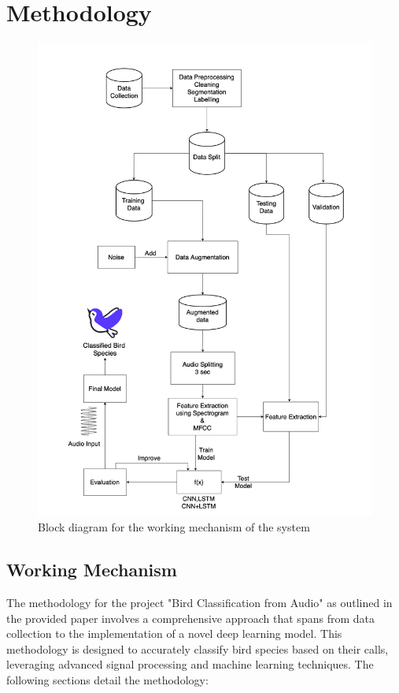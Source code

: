 \chapter{Methodology}
\begin{figure}[h!]
    \centering
        \includegraphics[scale=0.37]{images/Methodology.png}
        \caption{Block diagram for the working mechanism of the system}%
    \end{figure}
\newpage
\section{Working Mechanism}
The methodology for the project "Bird Classification from Audio" as outlined in the provided paper involves a comprehensive approach that spans from data collection to the implementation of a novel deep learning model. This methodology is designed to accurately classify bird species based on their calls, leveraging advanced signal processing and machine learning techniques. The following sections detail the methodology:

